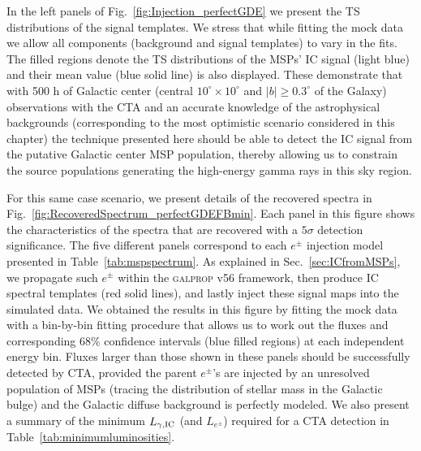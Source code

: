 \documentclass[doublespace,nopageskip]{VTthesis} %
\begin{document}
In the left panels of Fig.~\ref{fig:Injection_perfectGDE} we present the TS distributions of the signal templates. We stress that while fitting the mock data we allow all components (background and signal templates) to vary in the fits. The filled regions denote the TS distributions of the MSPs' IC signal (light blue) and their mean value (blue solid line) is also displayed. These demonstrate that with 500 h of Galactic center (central $10^\circ\times10^\circ$ and $|b|\geq0.3^\circ$ of the Galaxy)  observations 
with the CTA
and an accurate knowledge of the astrophysical backgrounds (corresponding to the most optimistic scenario considered in this chapter) the technique presented here should be able to detect the IC signal from the putative Galactic center MSP population, thereby allowing us to constrain the source populations generating the high-energy gamma rays in this sky region.

For this same case scenario, we present details of the recovered spectra in Fig.~\ref{fig:RecoveredSpectrum_perfectGDEFBmin}. Each panel in this figure shows the characteristics of the spectra that are recovered with a $5\sigma$ detection significance. The five different panels correspond to each $e^\pm$ injection model presented in Table~\ref{tab:mspspectrum}. As explained in Sec.~\ref{sec:ICfromMSPs}, we propagate such $e^\pm$ within the \textsc{galprop} v56 framework, then produce IC spectral templates (red solid lines), and lastly inject these signal maps into the simulated data. We obtained the results in this figure by fitting the mock data with a bin-by-bin fitting procedure that allows us to work out the fluxes and corresponding 68\% confidence intervals (blue filled regions) at each independent energy bin. Fluxes larger than those shown in these panels should be successfully detected by CTA, provided the parent $e^\pm$'s are injected by an unresolved population of MSPs (tracing the distribution of stellar mass in the Galactic bulge) and the Galactic diffuse background is perfectly modeled. We also present a summary of the minimum $L_{\gamma,{\rm IC}}$ (and $L_{e^\pm}$) 
required for a CTA detection in Table~\ref{tab:minimumluminosities}.
\end{document}
